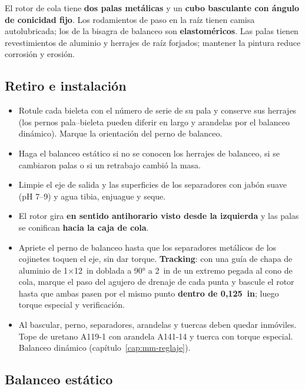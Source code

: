 El rotor de cola tiene \textbf{dos palas metálicas} y un \textbf{cubo basculante con ángulo de conicidad fijo}. Los rodamientos de paso en la raíz tienen camisa autolubricada; los de la bisagra de balanceo son \textbf{elastoméricos}. Las palas tienen revestimientos de aluminio y herrajes de raíz forjados; mantener la pintura reduce corrosión y erosión.


\subsection{Retiro e instalación}

\begin{itemize}
\item Rotule cada bieleta con el número de serie de su pala y conserve sus herrajes (los pernos pala--bieleta pueden diferir en largo y arandelas por el balanceo dinámico). Marque la orientación del perno de balanceo.
\item Haga el balanceo estático si no se conocen los herrajes de balanceo, si se cambiaron palas o si un retrabajo cambió la masa.
\item Limpie el eje de salida y las superficies de los separadores con jabón suave (pH 7--9) y agua tibia, enjuague y seque.
\item El rotor gira \textbf{en sentido antihorario visto desde la izquierda} y las palas se conifican \textbf{hacia la caja de cola}.
\item Apriete el perno de balanceo hasta que los separadores metálicos de los cojinetes toquen el eje, sin dar torque. \textbf{Tracking}: con una guía de chapa de aluminio de 1$\times$12~in doblada a 90° a 2~in de un extremo pegada al cono de cola, marque el paso del agujero de drenaje de cada punta y bascule el rotor hasta que ambas pasen por el mismo punto \textbf{dentro de 0,125~in}; luego torque especial y verificación.
\item Al bascular, perno, separadores, arandelas y tuercas deben quedar inmóviles. Tope de uretano A119-1 con arandela A141-14 y tuerca con torque especial. Balanceo dinámico (capítulo~\ref{cap:mm-reglaje}).
\end{itemize}

\subsection{Balanceo estático}

